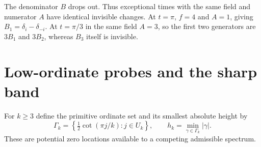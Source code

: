 \documentclass[11pt,letterpaper]{article}
\begin{document}
The denominator $B$ drops out. Thus exceptional times with the same field and numerator $A$ have identical invisible changes. At $t=\pi$, $f=4$ and $A=1$, giving $B_1=\delta_i-\delta_{-i}$. At $t=\pi/3$ in the same field $A=3$, so the first two generators are $3B_1$ and $3B_2$, whereas $B_3$ itself is invisible.

\section{Low-ordinate probes and the sharp band}\label{sec:band}

For $k\ge3$ define the primitive ordinate set and its smallest absolute height by
\[
 \Gamma_k=\left\{\tfrac12\cot(\pi j/k):j\in U_k\right\},\qquad
 h_k=\min_{\gamma\in\Gamma_k}|\gamma|.
\]
These are potential zero locations available to a competing admissible spectrum.
\end{document}
